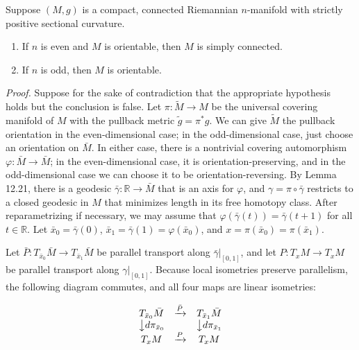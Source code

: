 \begin{theorem}[Synge]
\label{thm:synge-positive-sectional}
Suppose $(M, g)$ is a compact, connected Riemannian $n$-manifold with strictly positive sectional curvature.
\begin{enumerate}
\item[(a)] If $n$ is even and $M$ is orientable, then $M$ is simply connected.
\item[(b)] If $n$ is odd, then $M$ is orientable.
\end{enumerate}

\textit{Proof.} Suppose for the sake of contradiction that the appropriate hypothesis holds but the conclusion is false. Let $\pi: \tilde{M} \to M$ be the universal covering manifold of $M$ with the pullback metric $\tilde{g} = \pi^* g$. We can give $\tilde{M}$ the pullback orientation in the even-dimensional case; in the odd-dimensional case, just choose an orientation on $\bar{M}$. In either case, there is a nontrivial covering automorphism $\varphi : \bar{M} \to \bar{M}$; in the even-dimensional case, it is orientation-preserving, and in the odd-dimensional case we can choose it to be orientation-reversing. By Lemma 12.21, there is a geodesic $\bar{\gamma} : \mathbb{R} \to \bar{M}$ that is an axis for $\varphi$, and $\gamma = \pi \circ \bar{\gamma}$ restricts to a closed geodesic in $M$ that minimizes length in its free homotopy class. After reparametrizing if necessary, we may assume that $\varphi(\bar{\gamma}(t)) = \bar{\gamma}(t + 1)$ for all $t \in \mathbb{R}$. Let $\bar{x}_0 = \bar{\gamma}(0)$, $\bar{x}_1 = \bar{\gamma}(1) = \varphi(\bar{x}_0)$, and $x = \pi(\bar{x}_0) = \pi(\bar{x}_1)$.

Let $\bar{P} : T_{\bar{x}_0}\bar{M} \to T_{\bar{x}_1}\bar{M}$ be parallel transport along $\bar{\gamma}|_{[0,1]}$, and let $P : T_x M \to T_x M$ be parallel transport along $\gamma|_{[0,1]}$. Because local isometries preserve parallelism, the following diagram commutes, and all four maps are linear isometries:


\[
\begin{array}{ccc}
T_{\bar{x}_0}\bar{M} & \xrightarrow{\bar{P}} & T_{\bar{x}_1}\bar{M} \\
\big\downarrow d\pi_{\bar{x}_0} & & \big\downarrow d\pi_{\bar{x}_1} \\
T_x M & \xrightarrow{P} & T_x M
\end{array}
\]


\end{theorem}
